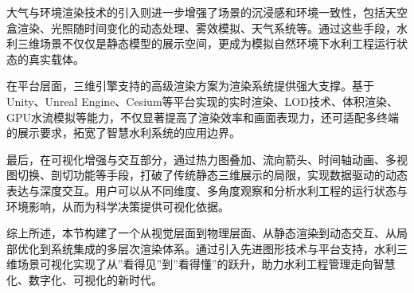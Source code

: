 大气与环境渲染技术的引入则进一步增强了场景的沉浸感和环境一致性，包括天空盒渲染、光照随时间变化的动态处理、雾效模拟、天气系统等。通过这些手段，水利三维场景不仅仅是静态模型的展示空间，更成为模拟自然环境下水利工程运行状态的真实载体。

在平台层面，三维引擎支持的高级渲染方案为渲染系统提供强大支撑。基于Unity、Unreal
Engine、Cesium等平台实现的实时渲染、LOD技术、体积渲染、GPU水流模拟等能力，不仅显著提高了渲染效率和画面表现力，还可适配多终端的展示要求，拓宽了智慧水利系统的应用边界。

最后，在可视化增强与交互部分，通过热力图叠加、流向箭头、时间轴动画、多视图切换、剖切功能等手段，打破了传统静态三维展示的局限，实现数据驱动的动态表达与深度交互。用户可以从不同维度、多角度观察和分析水利工程的运行状态与环境影响，从而为科学决策提供可视化依据。

综上所述，本节构建了一个从视觉层面到物理层面、从静态渲染到动态交互、从局部优化到系统集成的多层次渲染体系。通过引入先进图形技术与平台支持，水利三维场景可视化实现了从''看得见''到''看得懂''的跃升，助力水利工程管理走向智慧化、数字化、可视化的新时代。

